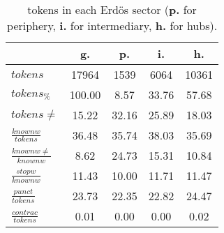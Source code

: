 \begin{table}[h!]
\begin{center}
\begin{tabular}{| l || c | c | c | c |}\hline
 & {\bf g.} & {\bf p.} & {\bf i.} & {\bf h.} \\\hline\hline
$tokens$ & 17964  & 1539  & 6064  & 10361 \\
$tokens_{\%}$ & 100.00  & 8.57  & 33.76  & 57.68 \\
$tokens \neq$ & 15.22  & 32.16  & 25.89  & 18.03 \\\hline
$\frac{knownw}{tokens}$ & 36.48  & 35.74  & 38.03  & 35.69 \\
$\frac{knownw \neq}{knownw}$ & 8.62  & 24.73  & 15.31  & 10.84 \\\hline
$\frac{stopw}{knownw}$ & 11.43  & 10.00  & 11.71  & 11.47 \\
$\frac{punct}{tokens}$ & 23.73  & 22.35  & 22.82  & 24.47 \\
$\frac{contrac}{tokens}$ & 0.01  & 0.00  & 0.00  & 0.02 \\\hline
\end{tabular}
\caption{tokens in each Erd\"os sector ({{\bf p.}} for periphery, {{\bf i.}} for intermediary, 
    {{\bf h.}} for hubs).}
\end{center}
\end{table}
